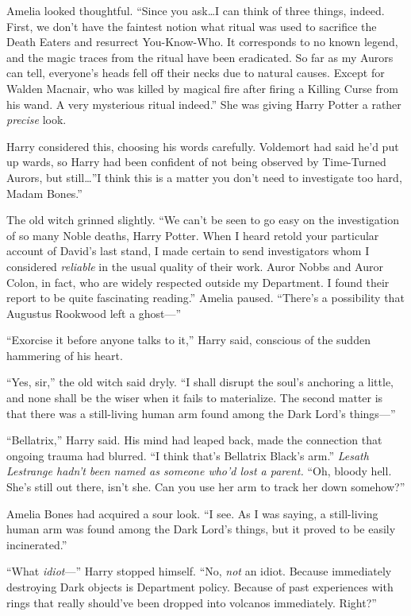 Amelia looked thoughtful. “Since you ask…I can think of three things, indeed. First, we don’t have the faintest notion what ritual was used to sacrifice the Death Eaters and resurrect You-Know-Who. It corresponds to no known legend, and the magic traces from the ritual have been eradicated. So far as my Aurors can tell, everyone’s heads fell off their necks due to natural causes. Except for Walden Macnair, who was killed by magical fire after firing a Killing Curse from his wand. A very mysterious ritual indeed.” She was giving Harry Potter a rather \emph{precise} look.

Harry considered this, choosing his words carefully. Voldemort had said he’d put up wards, so Harry had been confident of not being observed by Time-Turned Aurors, but still…”I think this is a matter you don’t need to investigate too hard, Madam Bones.”

The old witch grinned slightly. “We can’t be seen to go easy on the investigation of so many Noble deaths, Harry Potter. When I heard retold your particular account of David’s last stand, I made certain to send investigators whom I considered \emph{reliable} in the usual quality of their work. Auror Nobbs and Auror Colon, in fact, who are widely respected outside my Department. I found their report to be quite fascinating reading.” Amelia paused. “There’s a possibility that Augustus Rookwood left a ghost—”

“Exorcise it before anyone talks to it,” Harry said, conscious of the sudden hammering of his heart.

“Yes, sir,” the old witch said dryly. “I shall disrupt the soul’s anchoring a little, and none shall be the wiser when it fails to materialize. The second matter is that there was a still-living human arm found among the Dark Lord’s things—”

“Bellatrix,” Harry said. His mind had leaped back, made the connection that ongoing trauma had blurred. “I think that’s Bellatrix Black’s arm.” \emph{Lesath Lestrange hadn’t been named as someone who’d lost a parent.} “Oh, bloody hell. She’s still out there, isn’t she. Can you use her arm to track her down somehow?”

Amelia Bones had acquired a sour look. “I see. As I was saying, a still-living human arm was found among the Dark Lord’s things, but it proved to be easily incinerated.”

“What \emph{idiot}—” Harry stopped himself. “No, \emph{not} an idiot. Because immediately destroying Dark objects is Department policy. Because of past experiences with rings that really should’ve been dropped into volcanos immediately. Right?”

